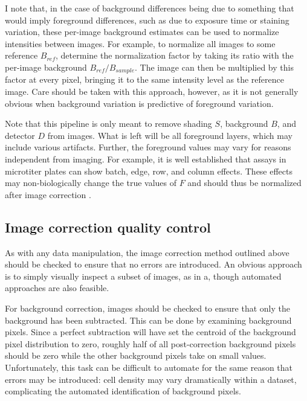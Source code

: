 \begin{enumerate}
\begin{itemize}
I note that, in the case of background
differences being due to something that would imply foreground
differences, such as due to exposure time or staining
variation, these per-image background estimates can be used
to normalize intensities between images. For example, to
normalize all images to some reference $B_{ref}$, determine the
normalization factor by taking its ratio with the per-image
background $B_{ref}/B_{sample}$. The image can then be multiplied by this
factor at every pixel, bringing it to the same intensity level
as the reference image. Care should be taken with this approach,
however, as it is not generally obvious when background variation
is predictive of foreground variation. 
\end{itemize}

\end{enumerate}

Note that this pipeline is only meant to remove shading $S$,
background $B$, and detector $D$ from images. What is left will
be all foreground layers, which may include various artifacts.
Further, the foreground values may vary for reasons independent
from imaging. For example, it is well established that assays
in microtiter plates can show batch, edge, row, and column effects.
These effects may non-biologically change the true values of $F$
and should thus be normalized after image correction
\cite{Malo2006,Dragiev2011,Dragiev2012,Carralot2012,Zhong2013}.

  
\subsection{Image correction quality control}

As with any data manipulation, the image correction
method outlined above should be checked to ensure
that no errors are introduced.
An obvious approach is to simply
visually inspect a subset of images, as in 
a,
though automated approaches are also feasible.


For background correction,
images should be checked to ensure that only the
background has been subtracted. This can be done
by examining background pixels. Since a perfect
subtraction will have set the centroid of the
background pixel distribution to zero, roughly half
of all post-correction background pixels should
be zero while the other background pixels take on small values.
Unfortunately, this task can be difficult to automate
for the same reason that errors may be introduced:
cell density may vary dramatically within a dataset,
complicating the automated identification of background pixels.


